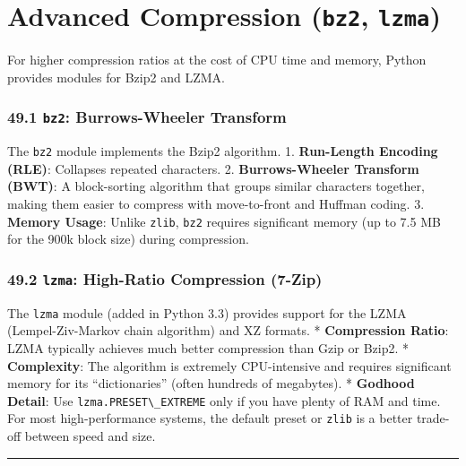 \hypertarget{advanced-compression-bz2-lzma}{%
\chapter{\texorpdfstring{Advanced Compression (\texttt{bz2},
\texttt{lzma})}{Advanced Compression (bz2, lzma)}}\label{advanced-compression-bz2-lzma}}

For higher compression ratios at the cost of CPU time and memory, Python
provides modules for Bzip2 and LZMA.

\hypertarget{bz2-burrows-wheeler-transform}{%
\subsection{\texorpdfstring{49.1 \texttt{bz2}: Burrows-Wheeler
Transform}{49.1 bz2: Burrows-Wheeler Transform}}\label{bz2-burrows-wheeler-transform}}

The \passthrough{\lstinline!bz2!} module implements the Bzip2 algorithm.
1. \textbf{Run-Length Encoding (RLE)}: Collapses repeated characters. 2.
\textbf{Burrows-Wheeler Transform (BWT)}: A block-sorting algorithm that
groups similar characters together, making them easier to compress with
move-to-front and Huffman coding. 3. \textbf{Memory Usage}: Unlike
\passthrough{\lstinline!zlib!}, \passthrough{\lstinline!bz2!} requires
significant memory (up to 7.5 MB for the 900k block size) during
compression.

\hypertarget{lzma-high-ratio-compression-7-zip}{%
\subsection{\texorpdfstring{49.2 \texttt{lzma}: High-Ratio Compression
(7-Zip)}{49.2 lzma: High-Ratio Compression (7-Zip)}}\label{lzma-high-ratio-compression-7-zip}}

The \passthrough{\lstinline!lzma!} module (added in Python 3.3) provides
support for the LZMA (Lempel-Ziv-Markov chain algorithm) and XZ formats.
* \textbf{Compression Ratio}: LZMA typically achieves much better
compression than Gzip or Bzip2. * \textbf{Complexity}: The algorithm is
extremely CPU-intensive and requires significant memory for its
``dictionaries'' (often hundreds of megabytes). * \textbf{Godhood
Detail}: Use \passthrough{\lstinline!lzma.PRESET\_EXTREME!} only if you
have plenty of RAM and time. For most high-performance systems, the
default preset or \passthrough{\lstinline!zlib!} is a better trade-off
between speed and size.

\begin{center}\rule{0.5\linewidth}{0.5pt}\end{center}
